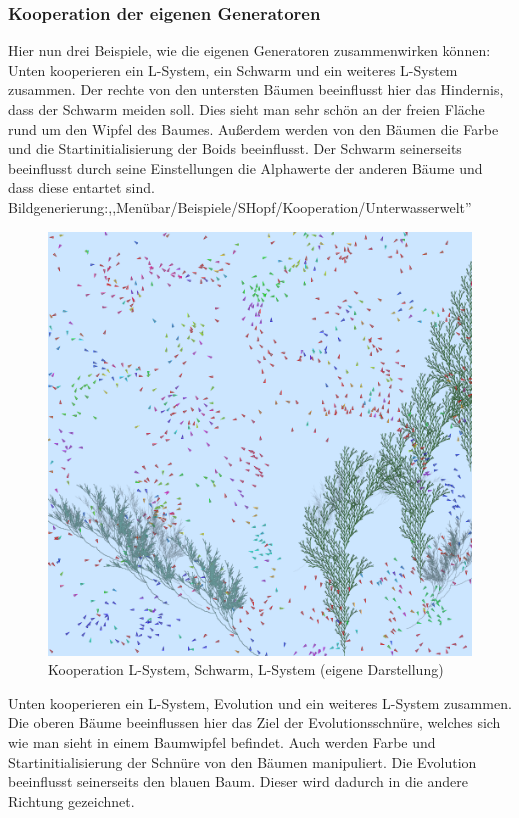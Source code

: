 \documentclass[../mciAusarbeitung.tex]{subfiles}
\begin{document}
	\subsubsection{Kooperation der eigenen Generatoren}
		Hier nun drei Beispiele, wie die eigenen Generatoren zusammenwirken können:\\
		Unten kooperieren ein L-System, ein Schwarm und ein weiteres L-System zusammen. Der rechte von den untersten Bäumen beeinflusst hier das Hindernis, dass der Schwarm meiden soll. Dies sieht man sehr schön an der freien Fläche rund um den Wipfel des Baumes.
		Außerdem werden von den Bäumen die Farbe und die Startinitialisierung der Boids beeinflusst. Der Schwarm seinerseits beeinflusst durch seine Einstellungen die Alphawerte der anderen Bäume und dass diese entartet sind.\\
		Bildgenerierung:,,Menübar/Beispiele/SHopf/Kooperation/Unterwasserwelt''\\
		\begin{figure}[H]
			\centering
			\includegraphics[width=\linewidth]{img/unterwasserwelt.png}
			\caption[Unterwasserwelt]{Kooperation L-System, Schwarm, L-System (eigene Darstellung)}
		\end{figure} 
		\noindent Unten kooperieren ein L-System, Evolution und ein weiteres L-System zusammen. Die oberen Bäume beeinflussen hier das Ziel der Evolutionsschnüre, welches sich wie man sieht in einem Baumwipfel befindet. Auch werden Farbe und Startinitialisierung der Schnüre von den Bäumen manipuliert. Die Evolution beeinflusst seinerseits den blauen Baum. Dieser wird dadurch in die andere Richtung gezeichnet.\\
\end{document}
